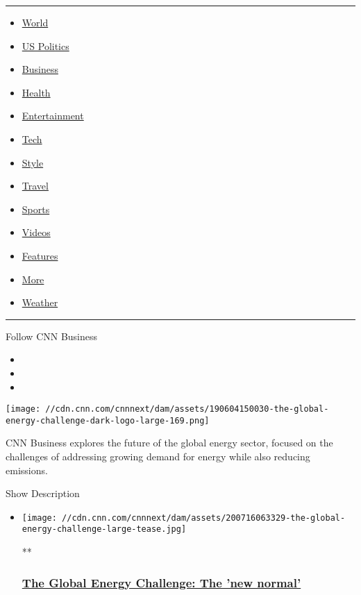 \begin{center}\rule{0.5\linewidth}{\linethickness}\end{center}

\begin{itemize}
\tightlist
\item
  \href{/world}{World}
\item
  \href{/politics}{US Politics}
\item
  \href{/business}{Business}
\item
  \href{/health}{Health}
\item
  \href{/entertainment}{Entertainment}
\item
  \href{/business/tech}{Tech}
\item
  \href{/style}{Style}
\item
  \href{/travel}{Travel}
\item
  \href{/sport}{Sports}
\item
  \href{/videos}{Videos}
\item
  \href{/specials}{Features}
\item
  \href{/more}{More}
\item
  \href{/weather}{Weather}
\end{itemize}

\begin{center}\rule{0.5\linewidth}{\linethickness}\end{center}

Follow CNN Business

\begin{itemize}
\item
\item
\item
\end{itemize}

\texttt{[image: //cdn.cnn.com/cnnnext/dam/assets/190604150030-the-global-energy-challenge-dark-logo-large-169.png]}

CNN Business explores the future of the global energy sector, focused on
the challenges of addressing growing demand for energy while also
reducing emissions.

Show Description

\begin{itemize}
\item
  \href{/videos/business/2020/07/16/the-global-energy-challenge.cnnbusiness}{}

  \texttt{[image: //cdn.cnn.com/cnnnext/dam/assets/200716063329-the-global-energy-challenge-large-tease.jpg]}

  **

  \hypertarget{the-global-energy-challenge-the-new-normal}{%
  \subsubsection{\texorpdfstring{\href{/videos/business/2020/07/16/the-global-energy-challenge.cnnbusiness}{The
  Global Energy Challenge: The 'new
  normal'}}{The Global Energy Challenge: The 'new normal'}}\label{the-global-energy-challenge-the-new-normal}}
\end{itemize}

